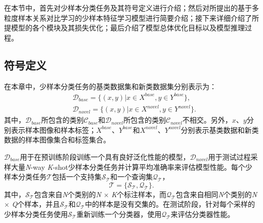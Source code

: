在本节中，首先对少样本分类任务及其符号定义进行介绍；然后对所提出的基于多粒度样本关系对比学习的少样本特征学习模型进行简要介绍；接下来详细介绍了所提模型的各个模块及其损失优化；最后介绍了模型总体优化目标以及模型推理过程。

\subsection[\hspace{-2pt}符号定义]{{\heiti{} \hspace{-8pt}符号定义}}\label{section3: 符号定义}

在本章中，少样本分类任务的基类数据集和新类数据集分别表示为：
\begin{equation}
\begin{aligned}
  &\mathcal{D}_{base} = \{(x, y)|x \in X^{base}, y \in Y^{base}\}, \\
  &\mathcal{D}_{novel} = \{(x, y)|x \in X^{novel}, y \in Y^{novel}\}.
\end{aligned}
\end{equation}
其中，$\mathcal{D}_{base}$所包含的类别$\mathcal{C}_{base}$和$\mathcal{D}_{novel}$所包含的类别$\mathcal{C}_{novel}$不相交。另外，$x$、$y$分别表示样本图像和样本标签；$X^{base}$、$Y^{base}$和$X^{novel}$、$Y^{novel}$分别表示基类数据和新类数据的样本图像集合和标签集合。

$\mathcal{D}_{base}$用于在预训练阶段训练一个具有良好泛化性能的模型，$\mathcal{D}_{novel}$用于测试过程采样大量\emph{N}-way \emph{K}-shot少样本分类任务并计算平均准确率来评估模型性能。每个少样本分类任务$\mathcal{T}$包括一个支持集$\mathcal{S}_\mathcal{T}$和一个查询集$\mathcal{Q}_\mathcal{T}$，
\begin{equation}
  \mathcal{T} = \{\mathcal{S}_\mathcal{T}, \mathcal{Q}_\mathcal{T}\}.
\end{equation}
其中，$\mathcal{S}_\mathcal{T}$包含来自\emph{N}个类别的\emph{N} $\times$ \emph{K}个标注样本，而$\mathcal{Q}_\mathcal{T}$包含来自相同\emph{N}个类别的\emph{N} $\times$ \emph{Q}个样本，并且$\mathcal{S}_\mathcal{T}$和$\mathcal{Q}_\mathcal{T}$中的样本是没有交集的。在测试阶段，针对每个采样的少样本分类任务使用$\mathcal{S}_\mathcal{T}$重新训练一个分类器，使用$\mathcal{Q}_\mathcal{T}$来评估分类器性能。

